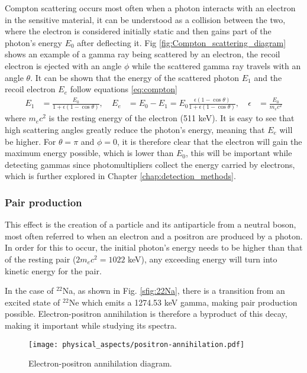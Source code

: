 Compton scattering occurs most often when a photon interacts with an electron in the sensitive material, it can be understood as a collision between the two, where the electron is considered initially static and then gains part of the photon's energy $E_0$ after deflecting it. Fig \ref{fig:Compton_scattering_diagram} shows an example of a gamma ray being scattered by an electron, the recoil electron is ejected with an angle $\phi$ while the scattered gamma ray travels with an angle $\theta$. It can be shown that the energy of the scattered photon $E_{1}$ and the recoil electron $E_e$ follow equations \eqref{eq:compton}
\begin{align}
  E_{1} &= \frac{E_0}{1+\epsilon(1-\cos\theta)} \label{eq:compton},~ & E_e &= E_0 - E_1 = E_0\frac{\epsilon(1-\cos\theta)}{1+\epsilon(1-\cos\theta)},~ & \epsilon&=\frac{E_0}{m_{e}c^2} 
\end{align}
where $m_e c^2$ is the resting energy of the electron (511 \unit{\kilo\eV}). It is easy to see that high scattering angles greatly reduce the photon's energy, meaning that $E_e$ will be higher. For $\theta=\pi$ and $\phi=0$, it is therefore clear that the electron will gain the maximum energy possible, which is lower than $E_0$, this will be important while detecting gammas since photomultipliers collect the energy carried by electrons, which is further explored in Chapter \ref{chap:detection_methods}.

\subsubsection{Pair production}

This effect is the creation of a particle and its antiparticle from a neutral boson, most often referred to when an electron and a positron are produced by a photon. In order for this to occur, the initial photon's energy needs to be higher than that of the resting pair ($2m_e c^2=1022$ \unit{\kilo\eV}), any exceeding energy will turn into kinetic energy for the pair.

In the case of $^{22}$Na, as shown in Fig. \ref{sfig:22Na}, there is a transition from an excited state of $^{22}$Ne which emits a 1274.53 \unit{\kilo\eV} gamma, making pair production possible. Electron-positron annihilation is therefore a byproduct of this decay, making it important while studying its spectra.

\begin{figure}[H]
  \centering
  \texttt{[image: physical\_aspects/positron-annihilation.pdf]}
  \caption{\label{fig:positron_annihilation_diagram}Electron-positron annihilation diagram.}
\end{figure}

